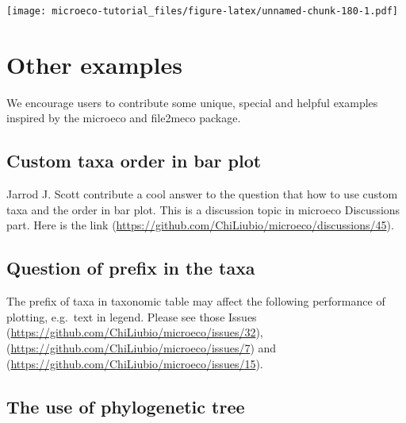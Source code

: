 \documentclass[
]{book}
\newenvironment{Shaded}{\begin{snugshade}}{\end{snugshade}}
\newcommand{\AttributeTok}[1]{\textcolor[rgb]{0.77,0.63,0.00}{#1}}
\newcommand{\ConstantTok}[1]{\textcolor[rgb]{0.00,0.00,0.00}{#1}}
\newcommand{\FunctionTok}[1]{\textcolor[rgb]{0.00,0.00,0.00}{#1}}
\newcommand{\NormalTok}[1]{#1}
\newcommand{\SpecialCharTok}[1]{\textcolor[rgb]{0.00,0.00,0.00}{#1}}
\newcommand{\StringTok}[1]{\textcolor[rgb]{0.31,0.60,0.02}{#1}}
\begin{document}
\begin{Shaded}
\end{Shaded}

\texttt{[image: microeco-tutorial\_files/figure-latex/unnamed-chunk-180-1.pdf]}

\hypertarget{other-examples}{%
\chapter{Other examples}\label{other-examples}}

We encourage users to contribute some unique, special and helpful examples inspired by the microeco and file2meco package.

\hypertarget{custom-taxa-order-in-bar-plot}{%
\section{Custom taxa order in bar plot}\label{custom-taxa-order-in-bar-plot}}

Jarrod J. Scott contribute a cool answer to the question that how to use custom taxa and the order in bar plot.
This is a discussion topic in microeco Discussions part. Here is the link (\url{https://github.com/ChiLiubio/microeco/discussions/45}).

\hypertarget{question-of-prefix-in-the-taxa}{%
\section{Question of prefix in the taxa}\label{question-of-prefix-in-the-taxa}}

The prefix of taxa in taxonomic table may affect the following performance of plotting, e.g.~text in legend.
Please see those Issues (\url{https://github.com/ChiLiubio/microeco/issues/32}), (\url{https://github.com/ChiLiubio/microeco/issues/7})
and (\url{https://github.com/ChiLiubio/microeco/issues/15}).

\hypertarget{the-use-of-phylogenetic-tree}{%
\section{The use of phylogenetic tree}\label{the-use-of-phylogenetic-tree}}
\end{document}
